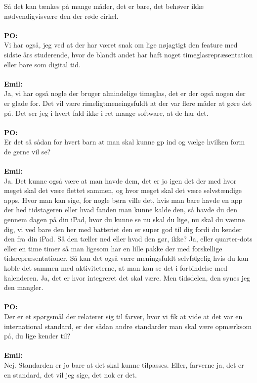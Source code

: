 Så det kan tænkes på mange måder, det er bare, det behøver ikke nødvendigvisvære den der røde cirkel.
\\\\
\textbf{PO:}\\
Vi har også, jeg ved at der har været snak om lige nøjagtigt den feature med sidste års studerende, hvor de blandt andet har haft noget timeglasrepræsentation eller bare som digital tid.
\\\\
\textbf{Emil:}\\
Ja, vi har også nogle der bruger almindelige timeglas, det er der også nogen der er glade for.
Det vil være rimeligtmeneingsfuldt at der var flere måder at gøre det på.
Det ser jeg i hvert fald ikke i ret mange software, at de har det. 
\\\\
\textbf{PO:}\\
Er det så sådan for hvert barn at man skal kunne gp ind og vælge hvilken form de gerne vil se?
\\\\
\textbf{Emil:}\\
Ja.
Det kunne også være at man havde dem, det er jo igen det der med hvor meget skal det være flettet sammen, og hvor meget skal det være selvstændige apps. 
Hvor man kan sige, for nogle børn ville det, hvis man bare havde en app der hed tidstageren eller hvad fanden man kunne kalde den, så havde du den gennem dagen på din iPad, hvor du kunne se nu skal du lige, nu skal du vænne dig, vi ved bare den her med batteriet den er super god til dig fordi du kender den fra din iPad.
Så den tæller ned eller hvad den gør, ikke?
Ja, eller quarter-dots eller en time timer så man ligesom har en lille pakke der med forskellige tidsrepræsentationer.  
Så kan det også være meningsfuldt selvfølgelig hvis du kan koble det sammen med aktiviteterne, at man kan se det i forbindelse med kalenderen. 
Ja, det er hvor integreret det skal være.   
Men tidsdelen, den synes jeg den mangler.
\\\\
\textbf{PO:}\\
Der er et spørgsmål der relaterer sig til farver, hvor vi fik at vide at det var en international standard, er der sådan andre standarder man skal være opmærksom på, du lige kender til?
\\\\
\textbf{Emil:} \\
Nej.
Standarden er jo bare at det skal kunne tilpasses. 
Eller, farverne ja, det er en standard, det vil jeg sige, det nok er det. 
